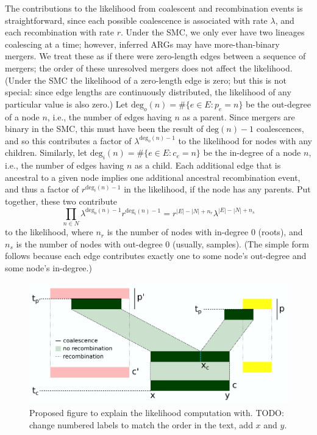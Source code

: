 \documentclass{article}
\renewcommand{\deg}{\mathrm{deg}}
\begin{document}
The contributions to the likelihood from coalescent and recombination events
is straightforward, since each possible coalescence is associated with rate $\lambda$,
and each recombination with rate $r$.
Under the SMC, we only ever have two lineages coalescing at a time;
however, inferred ARGs may have more-than-binary mergers.
We treat these as if there were zero-length edges
between a sequence of mergers;
the order of these unresolved mergers does not affect the likelihood.
(Under the SMC the likelihood of a zero-length edge is zero;
but this is not special: since edge lengths are continuously distributed,
the likelihood of any particular value is also zero.)
Let $\deg_o(n) = \#\{e \in E : p_e=n\}$ be the out-degree of a node $n$,
i.e., the number of edges having $n$ as a parent.
Since mergers are binary in the SMC,
this must have been the result of $\deg(n) - 1$ coalescences,
and so this contributes a factor of $\lambda^{\deg_o(n)-1}$ to the likelihood
for nodes with any children.
Similarly,
let $\deg_i(n) = \#\{e \in E : c_e=n\}$ be the in-degree of a node $n$,
i.e., the number of edges having $n$ as a child.
Each additional edge that is ancestral to a given node
implies one additional ancestral recombination event,
and thus a factor of  $r^{\deg_i(n)-1}$ in the likelihood,
if the node has any parents.
Put together, these two contribute
\begin{equation}\label{eq:coal}
    \prod_{n \in N} \lambda^{\deg_o(n)-1} r^{\deg_i(n)-1}  
    =
    r^{|E|-|N|+n_r} 
    \lambda^{|E|-|N|+n_s} 
\end{equation}
to the likelihood,
where $n_r$ is the number of nodes with in-degree 0 (roots),
and $n_s$ is the number of nodes with out-degree 0 (usually, samples).
(The simple form follows because each edge contributes exactly one
to some node's out-degree and some node's in-degree.)


\begin{figure}
    \centering
    \includegraphics[width=\textwidth]{figures/single_event.png}
    \caption{
        Proposed figure to explain the likelihood computation with.
        TODO: change numbered labels to match the order in the text,
        add $x$ and $y$.
        \label{fig:likelihood}
    }
\end{figure}
\end{document}

